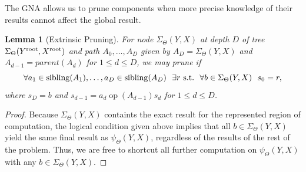 \documentclass{article}
\newtheorem{lemma}{Lemma}
\newcommand{\killspace}{\vspace{-0.08in}}
\newcommand{\GNP}[1][\psi]{{#1}_{\Theta}}
\DeclareMathOperator{\sibling}{sibling}
\DeclareMathOperator{\op}{op}
\newcommand{\st}{{\rm~s.t.~}}
\newcommand{\kdroot}[1]{#1^{\text{\rm root}}}
\begin{document}
The GNA allows us to prune components when more precise knowledge of
their results cannot affect the global result.
\begin{lemma}[Extrinsic Pruning]\label{lem:extrinsic}
  For node $\GNP[\Sigma](Y,X)$ at depth $D$ of tree
  $\GNP[\Sigma](\kdroot{Y},\kdroot{X})$ and path $A_0,\ldots,A_D$ given by
  $A_D = \GNP[\Sigma](Y,X)$ and $A_{d-1} = parent(A_{d})$ for $1 \leq
  d \leq D$, we may prune if
  \[
  \forall a_1 \in \sibling(A_1),\ldots,a_D \in \sibling(A_D)~~ \exists r \st~ \forall b \in \GNP[\Sigma](Y,X)~~ s_0 = r,
  \]
  where $s_D = b$ and $s_{d-1} = a_d \mathbin{\op(A_{d-1})} s_d$ for $1 \leq d
    \leq D$.
\end{lemma}
\killspace
\killspace
\begin{proof}
  Because $\GNP[\Sigma](Y,X)$ containts the exact result for the
  represented region of computation, the logical condition given above
  implies that all $b \in \GNP[\Sigma](Y,X)$ yield the same final
  result as $\GNP(Y,X)$, regardless of the results of the rest of the
  problem.  Thus, we are free to shortcut all further computation on
  $\GNP(Y,X)$ with any $b \in \GNP[\Sigma](Y,X)$.
\end{proof}
\end{document}
